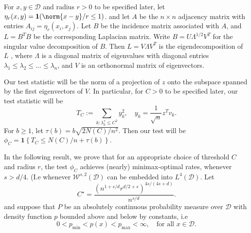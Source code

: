 \documentclass{article}
\newcommand{\set}[1]{\left\{#1\right\}}
\newcommand{\1}{\mathbf{1}}
\newcommand{\D}{\mathcal{D}}
\theoremstyle{alden}
\theoremstyle{aldenthm}
\theoremstyle{definition}
\theoremstyle{remark}
\begin{document}
For $x,y \in \mathcal{D}$ and radius $r > 0$ to be specified later, let $\eta_r(x,y) = \mathbf{1}(\norm{x - y}/ r \leq 1)$. and let $A$ be the $n \times n$ adjacency matrix with entries $A_{ij} = \eta_r(x_i,x_j)$. Let $B$ be the incidence matrix associated with $A$, and $L = B^TB$ be the corresponding Laplacian matrix. Write $B = U \Lambda^{1/2}V^T$ for the singular value decomposition of $B$. Then $L = V \Lambda V^T$ is the eigendecomposition of $L$ , where $\Lambda$ is a diagonal matrix of eigenvalues with diagonal entries $\lambda_1 \leq \lambda_2 \leq \ldots \leq \lambda_n$, and $V$ is an orthonormal matrix of eigenvectors. 

Our test statistic will be the norm of a projection of $z$ onto the subspace spanned by the first eigenvectors of $V$. In particular, for $C > 0$ to be specified later, our test statistic will be
\begin{equation*}
T_C := \sum_{k: \lambda_k^s \leq C^2} y_k^2, \quad y_k = \frac{1}{\sqrt{n}} z^T v_k.
\end{equation*}
For $b \geq 1$, let $\tau(b) = b\sqrt{2N(C)/n^2}$. Then our test will be $\phi_{C} = \mathbf{1}\set{T_C \leq N(C)/n + \tau(b)}$. 

In the following result, we prove that for an appropriate choice of threshold $C$ and radius $r$, the test $\phi_C$ achieves (nearly) minimax-optimal rates, whenever $s > d/4$. (I.e whenever $\mathcal{W}^{s,2}(\mathcal{D})$ can be embedded into $L^4(\mathcal{D})$. Let
\begin{equation}
\label{eqn:C_star_continuous}
C^{\star} = \frac{\left(n^{1 + s/d}r^{d/2 + s}\right)^{4s/(4s + d)}}{n^{s/d}}.
\end{equation}
and suppose that $P$ be an absolutely continuous probability measure over $\D$ with density function $p$ bounded above and below by constants, i.e
\begin{equation*}
0 < p_{\textrm{min}} < p(x) < p_{\textrm{max}} < \infty, \quad \textrm{for all $x \in \mathcal{D}$.}
\end{equation*}
\end{document}
